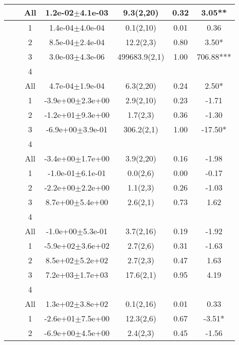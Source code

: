 \begin{longtable}{llccccS[table-format=-2.2, table-space-text-post = {***}]}
   &  & All &  1.2e-02$\pm$4.1e-03 & 9.3(2,20) & 0.32 & 3.05** \\ 
   \midrule
{} & {} & 1 &  1.4e-04$\pm$4.0e-04 & 0.1(2,10) & 0.01 & 0.36 \\ 
   &  & 2 &  8.5e-04$\pm$2.4e-04 & 12.2(2,3) & 0.80 & 3.50* \\ 
   &  & 3 &  3.0e-03$\pm$4.3e-06 & 499683.9(2,1) & 1.00 & 706.88*** \\ 
   &  & 4 &  &  &  &  \\ 
   &  & All &  4.7e-04$\pm$1.9e-04 & 6.3(2,20) & 0.24 & 2.50* \\ 
   \midrule
{} & {} & 1 & -3.9e+00$\pm$2.3e+00 & 2.9(2,10) & 0.23 & -1.71 \\ 
   &  & 2 & -1.2e+01$\pm$9.3e+00 & 1.7(2,3) & 0.36 & -1.30 \\ 
   &  & 3 & -6.9e+00$\pm$3.9e-01 & 306.2(2,1) & 1.00 & -17.50* \\ 
   &  & 4 &  &  &  &  \\ 
   &  & All & -3.4e+00$\pm$1.7e+00 & 3.9(2,20) & 0.16 & -1.98 \\ 
   \midrule
{} & {} & 1 & -1.0e-01$\pm$6.1e-01 & 0.0(2,6) & 0.00 & -0.17 \\ 
   &  & 2 & -2.2e+00$\pm$2.2e+00 & 1.1(2,3) & 0.26 & -1.03 \\ 
   &  & 3 &  8.7e+00$\pm$5.4e+00 & 2.6(2,1) & 0.73 & 1.62 \\ 
   &  & 4 &  &  &  &  \\ 
   &  & All & -1.0e+00$\pm$5.3e-01 & 3.7(2,16) & 0.19 & -1.92 \\ 
   \midrule
{} & {} & 1 & -5.9e+02$\pm$3.6e+02 & 2.7(2,6) & 0.31 & -1.63 \\ 
   &  & 2 &  8.5e+02$\pm$5.2e+02 & 2.7(2,3) & 0.47 & 1.63 \\ 
   &  & 3 &  7.2e+03$\pm$1.7e+03 & 17.6(2,1) & 0.95 & 4.19 \\ 
   &  & 4 &  &  &  &  \\ 
   &  & All &  1.3e+02$\pm$3.8e+02 & 0.1(2,16) & 0.01 & 0.33 \\ 
   \midrule
{} & {} & 1 & -2.6e+01$\pm$7.5e+00 & 12.3(2,6) & 0.67 & -3.51* \\ 
   &  & 2 & -6.9e+00$\pm$4.5e+00 & 2.4(2,3) & 0.45 & -1.56 \\ 

\end{longtable}
